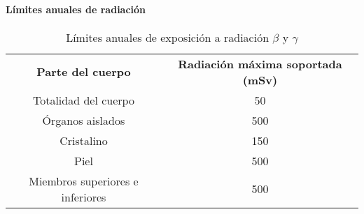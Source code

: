 \paragraph{Límites anuales de radiación}
\begin{table}[H]
    \centering
    \begin{tabular}{cc}
        \rowcolor[HTML]{000000} 
        {\color[HTML]{FFFFFF} \textbf{Parte del cuerpo}} & {\color[HTML]{FFFFFF} \textbf{Radiación máxima soportada (mSv)}} \\
        Totalidad del cuerpo             & 50  \\
        \rowcolor[HTML]{D9D9D9} 
        Órganos aislados                 & 500 \\
        Cristalino                       & 150 \\
        \rowcolor[HTML]{D9D9D9} 
        Piel                             & 500 \\
        Miembros superiores e inferiores & 500 \\ \hline
    \end{tabular}
    \caption{Límites anuales de exposición a radiación $\beta$ y $\gamma$}
    \label{tab:Adenda:RiesgoRadio:LimitesAnuales}
\end{table}
